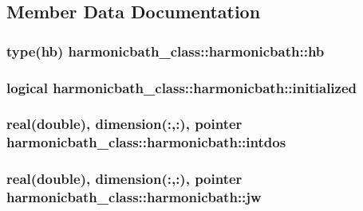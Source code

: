 \subsection{Member Data Documentation}
\hypertarget{structharmonicbath__class_1_1harmonicbath_a7b59e71a4b2100f821d091a5193d50f5}{
\subsubsection[{hb}]{\setlength{\rightskip}{0pt plus 5cm}type(hb) harmonicbath\-\_\-class\-::harmonicbath\-::hb\hspace{0.3cm}{\ttfamily [private]}}}\label{structharmonicbath__class_1_1harmonicbath_a7b59e71a4b2100f821d091a5193d50f5}
\hypertarget{structharmonicbath__class_1_1harmonicbath_a876fbdf98da8f3bfeb4b4e03b58d6f74}{
\subsubsection[{initialized}]{\setlength{\rightskip}{0pt plus 5cm}logical harmonicbath\-\_\-class\-::harmonicbath\-::initialized\hspace{0.3cm}{\ttfamily [private]}}}\label{structharmonicbath__class_1_1harmonicbath_a876fbdf98da8f3bfeb4b4e03b58d6f74}
\hypertarget{structharmonicbath__class_1_1harmonicbath_aded5880e44b831dddae5be30966594e4}{
\subsubsection[{intdos}]{\setlength{\rightskip}{0pt plus 5cm}real(double), dimension(\-:,\-:), pointer harmonicbath\-\_\-class\-::harmonicbath\-::intdos\hspace{0.3cm}{\ttfamily [private]}}}\label{structharmonicbath__class_1_1harmonicbath_aded5880e44b831dddae5be30966594e4}
\hypertarget{structharmonicbath__class_1_1harmonicbath_a5d4365532fe5feb53eb8bf06a64c8bcc}{
\subsubsection[{jw}]{\setlength{\rightskip}{0pt plus 5cm}real(double), dimension(\-:,\-:), pointer harmonicbath\-\_\-class\-::harmonicbath\-::jw\hspace{0.3cm}{\ttfamily [private]}}}\label{structharmonicbath__class_1_1harmonicbath_a5d4365532fe5feb53eb8bf06a64c8bcc}
